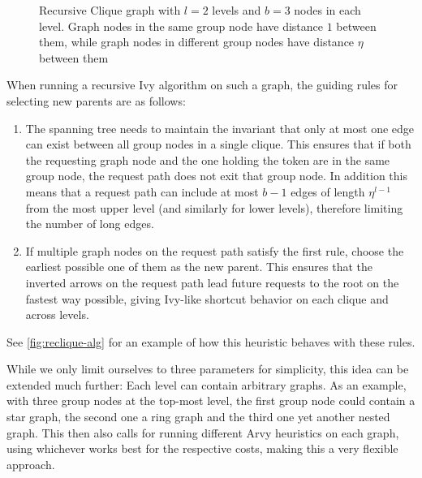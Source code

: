 \documentclass[a4paper, oneside]{discothesis}
\begin{document}
\begin{figure}[H]
\caption{Recursive Clique graph with $l=2$ levels and $b=3$ nodes in each level. Graph nodes in the same group node have distance $1$ between them, while graph nodes in different group nodes have distance $\eta$ between them}
\label{fig:reclique}
\end{figure}

When running a recursive Ivy algorithm on such a graph, the guiding rules for selecting new parents are as follows:
\begin{enumerate}
\item\label{reclique-invariant} The spanning tree needs to maintain the invariant that only at most one edge can exist between all group nodes in a single clique. This ensures that if both the requesting graph node and the one holding the token are in the same group node, the request path does not exit that group node. In addition this means that a request path can include at most $b-1$ edges of length $\eta^{l-1}$ from the most upper level (and similarly for lower levels), therefore limiting the number of long edges.
\item If multiple graph nodes on the request path satisfy the first rule, choose the earliest possible one of them as the new parent. This ensures that the inverted arrows on the request path lead future requests to the root on the fastest way possible, giving Ivy-like shortcut behavior on each clique and across levels.
\label{reclique-rule-early}
\end{enumerate}

See \autoref{fig:reclique-alg} for an example of how this heuristic behaves with these rules.

While we only limit ourselves to three parameters for simplicity, this idea can be extended much further: Each level can contain arbitrary graphs. As an example, with three group nodes at the top-most level, the first group node could contain a star graph, the second one a ring graph and the third one yet another nested graph. This then also calls for running different Arvy heuristics on each graph, using whichever works best for the respective costs, making this a very flexible approach.
\end{document}
